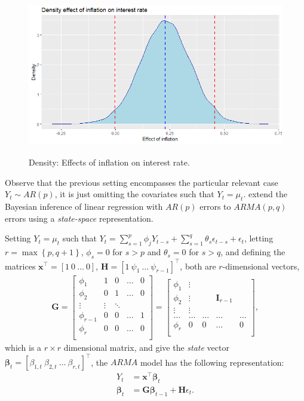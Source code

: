\begin{figure}[!h]
	\includegraphics[width=340pt, height=200pt]{Chapters/chapter8/figures/InfInt.png}
	\caption[List of figure caption goes here]{Density: Effects of inflation on interest rate.}\label{fig3}
\end{figure} 


Observe that the previous setting encompasses the particular relevant case  $Y_t\sim AR(p)$, it is just omitting the covariates such that $Y_t=\mu_t$. \cite{chib1994bayes} extend the Bayesian inference of linear regression with $AR(p)$ errors to $ARMA(p,q)$ errors using a \textit{state-space} representation. 

Setting $Y_t=\mu_t$ such that $Y_t=\sum_{s=1}^{p}\phi_jY_{t-s}+\sum_{s=1}^{q}\theta_s \epsilon_{t-s}+\epsilon_t$, letting $r=\max \left\{p,q+1\right\}$, $\phi_s=0$ for $s>p$ and $\theta_s=0$ for $s>q$, and defining the matrices $\bm{x}^{\top}=[1 \ 0 \ \dots \ 0]$, $\bm{H}=[1 \ \psi_1 \ \dots \ \psi_{r-1}]^{\top}$, both are $r$-dimensional vectors, 
\begin{align*}
	\bm{G}=\begin{bmatrix}
		\phi_1 & 1 & 0 & \dots & 0\\
		\phi_2 & 0 & 1 & \dots & 0\\
		\vdots & \vdots & \ddots &  &\\
		\phi_{r-1} & 0 & 0 & \dots & 1\\
		\phi_r & 0 & 0 & \dots & 0\\
	\end{bmatrix} = \begin{bmatrix}
		\phi_1 & \vdots &  &  & \\
		\phi_2 & \vdots &  & \bm{I}_{r-1}  & \\
		\vdots & \vdots &  &  &\\
		\dots & \dots & \dots & \dots & \dots\\
		\phi_r & 0 & 0 & \dots & 0\\
	\end{bmatrix},
\end{align*} 
which is a $r\times r$ dimensional matrix, and give the \textit{state} vector $\bm{\beta}_t=[\beta_{1,t} \ \beta_{2,t} \ \dots \ \beta_{r,t}]^{\top}$, the $ARMA$ model has the following representation:
\begin{align*}
	Y_t&=\bm{x}^{\top}\bm{\beta}_t\\
	\bm{\beta}_t &= \bm{G}\bm{\beta}_{t-1}+\bm{H}\epsilon_{t}.
\end{align*}

